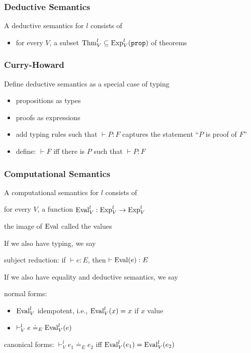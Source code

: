 \begin{frame}\frametitle{Deductive Semantics}
A deductive semantics for $l$ consists of
\begin{itemize}
\item for every $V$, a subset $\mathrm{Thm}^l_V\subseteq \mathrm{Exp}^l_V(\mathtt{prop})$ of theorems
\end{itemize}
\end{frame}

\begin{frame}\frametitle{Curry-Howard}
Define deductive semantics as a special case of typing
\begin{itemize}
\item propositions as types
\item proofs as expressions
\item add typing rules such that $\vdash P:F$ captures the statement ``$P$ is proof of $F$''
\item define: $\vdash F$ iff there is $P$ such that $\vdash P:F$
\end{itemize}
\end{frame}

\begin{frame}\frametitle{Computational Semantics}
\begin{blockitems}{A computational semantics for $l$ consists of}
\item for every $V$, a function $\mathrm{Eval}^l_V:\mathrm{Exp}^l_V\to\mathrm{Exp}^l_V$
\item the image of $\mathrm{Eval}$ called the values
\end{blockitems}

\begin{blockitems}{If we also have typing, we say}
 \item subject reduction: if $\vdash e:E$, then $\vdash \mathrm{Eval}(e):E$
\end{blockitems}

\begin{blockitems}{If we also have equality and deductive semantics, we say}
 \item normal forms:
  \begin{itemize}
  \item $\mathrm{Eval}^l_V$ idempotent, i.e., $\mathrm{Eval}^l_V(x)=x$ if $x$ value
  \item $\vdash^l_V e\doteq_E\mathrm{Eval}^l_V(e)$
  \end{itemize} 
 \item canonical forms: $\vdash^l_V e_1\doteq_E e_2$ iff $\mathrm{Eval}^l_V(e_1)=\mathrm{Eval}^l_V(e_2)$
\end{blockitems}
\end{frame}

